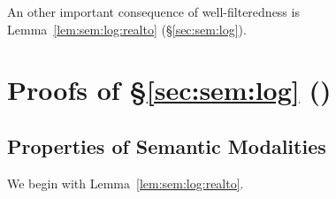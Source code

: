\documentclass[%
  a4paper,
  UKenglish,
  cleveref,
  autoref,
  thm-restate,
  numberwithinsect,
]{lipics-v2021}
\begin{document}
An other important consequence of well-filteredness is
Lemma~\ref{lem:sem:log:realto} (\S\ref{sec:sem:log}).



\section{Proofs of \S\ref{sec:sem:log} ()}
\label{sec:proof:sem:log}


\subsection{Properties of Semantic Modalities}
\label{sec:proof:sem:log:mod}

We begin with Lemma~\ref{lem:sem:log:realto}.

\LemWfArrow*
\end{document}
